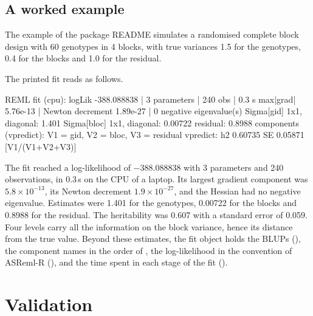 \documentclass[article,nojss]{jss}
\renewcommand{\pkg}[1]{#1}
\begin{document}
\subsection{A worked example}

The example of the package README simulates a randomised complete block design
with 60 genotypes in 4 blocks, with true variances 1.5 for the genotypes, 0.4
for the blocks and 1.0 for the residual.
The printed fit reads as follows.
\begin{CodeOutput}
REML fit (cpu): logLik -388.088838 | 3 parameters | 240 obs | 0.3 s
  max|grad| 5.76e-13 | Newton decrement 1.89e-27 | 0 negative eigenvalue(s)
  Sigma[gid] 1x1, diagonal: 1.401
  Sigma[bloc] 1x1, diagonal: 0.00722
  residual: 0.8988
  components (vpredict): V1 = gid, V2 = bloc, V3 = residual
  vpredict:
    h2            0.60735   SE  0.05871   [V1/(V1+V2+V3)]
\end{CodeOutput}
The fit reached a log-likelihood of $-388.088838$ with 3 parameters and 240
observations, in 0.3\,s on the CPU of a laptop. Its largest gradient component
was $5.8 ^{-13}$, its Newton decrement $1.9 ^{-27}$, and the
Hessian had no negative eigenvalue. Estimates were 1.401 for the genotypes,
0.00722 for the blocks and 0.8988 for the residual. The heritability was 0.607
with a standard error of 0.059. Four levels carry all the information on the block
variance, hence its distance from the true value. Beyond these estimates, the
fit object holds the BLUPs
(), the component names in the order of ,
the log-likelihood in the convention of \pkg{ASReml-R}
(), and the time spent in each stage of the fit
().

\section{Validation}\label{sec:validation}
\end{document}

